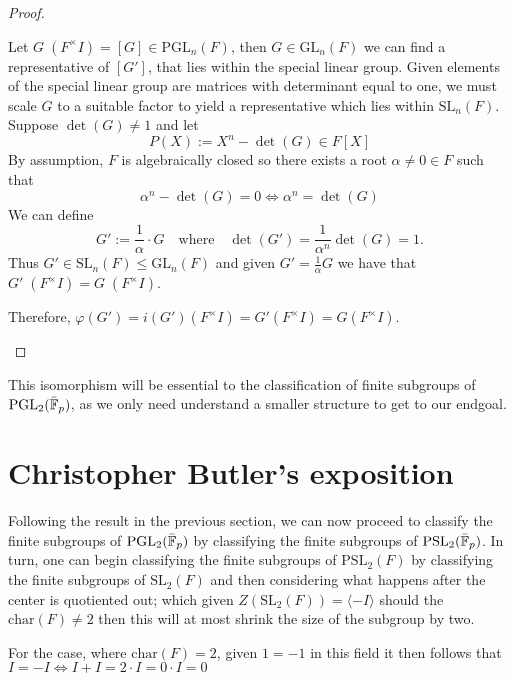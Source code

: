 \begin{proof}
\begin{itemize}
\begin{itemize}
    Let $G \; (F^\times I) = [G] \in \textrm{PGL}_n(F)$, then $G \in \textrm{GL}_n(F)$ we can find a representative of $[G']$, that lies within the special linear group.
    Given elements of the special linear group are matrices with determinant equal to one, we must scale $G$ to a suitable factor to yield a representative which lies within $\textrm{SL}_n(F)$. Suppose $\det(G) \ne 1$ and let
    \[
    P(X) := X^n - \det(G) \in F[X]
    \]
    By assumption, $F$ is algebraically closed so there exists a root $\alpha \ne 0\in F$ such that 
    \[
    \alpha^n - \det(G) = 0 \iff \alpha^n = \det(G)
    \]
    We can define
    \[
    G' := \frac{1}{\alpha} \cdot G \quad \text{where} \quad \det(G') = \frac{1}{\alpha^n} \det(G) = 1.
    \]
    Thus $G' \in \textrm{SL}_n(F) \leq \textrm{GL}_n(F)$ and given $G' = \frac{1}{\alpha} G$ we have that $G'  \; (F^\times I) = G \; (F^\times I)$.
    
    Therefore, $\varphi(G') = i(G') (F^\times I) = G' (F^\times I) = G (F^\times I)$.
\end{itemize}


\end{itemize}

\end{proof}

This isomorphism will be essential to the classification of finite subgroups of $\textrm{PGL}_2(\bar{\mathbb{F}}_p)$, as we only need understand a smaller structure to get to our endgoal.


\section{Christopher Butler's exposition}

Following the result in the previous section, we can now proceed to classify the finite subgroups of $\textrm{PGL}_2(\bar{\mathbb{F}}_p)$ by classifying the finite subgroups of $\textrm{PSL}_2(\bar{\mathbb{F}}_p)$. In turn, one can begin classifying the finite subgroups of $\textrm{PSL}_2(F)$ by classifying the finite subgroups of $\textrm{SL}_2(F)$ and then considering what happens after the center is quotiented out; which given $Z(\textrm{SL}_2(F)) = \langle -I\rangle$ should the $\textrm{char}(F) \ne 2$ then this will at most shrink the size of the subgroup by two. 

For the case, where $\textrm{char}(F) = 2$, given $1 = -1$ in this field it then follows that $I = -I \iff I + I =  2 \cdot I = 0 \cdot I = 0$